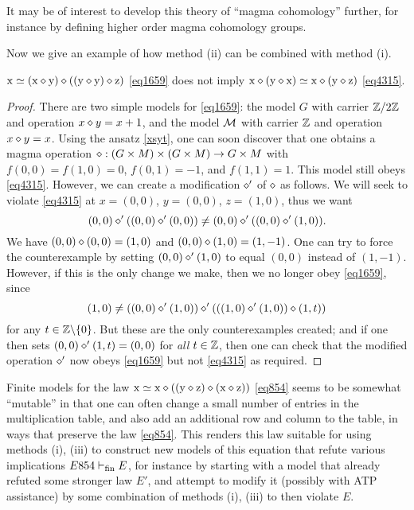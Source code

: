 It may be of interest to develop this theory of ``magma cohomology'' further, for instance by defining higher order magma cohomology groups.

Now we give an example of how method (ii) can be combined with method (i).

\begin{proposition}\label{1659-4315} $\mathrm{x} \simeq (\mathrm{x} \diamond \mathrm{y}) \diamond ((\mathrm{y} \diamond \mathrm{y}) \diamond \mathrm{z})$ \eqref{eq1659} does not imply $\mathrm{x} \diamond (\mathrm{y} \diamond \mathrm{x}) \simeq \mathrm{x} \diamond (\mathrm{y} \diamond \mathrm{z})$ \eqref{eq4315}.
\end{proposition}

\begin{proof}  There are two simple models for \eqref{eq1659}: the model $G$ with carrier $\mathbb{Z}/2\mathbb{Z}$ and operation $x \diamond y = x+1$, and the model ${\mathcal{M}}$ with carrier $\mathbb{Z}$ and operation $x \diamond y = x$.  Using the ansatz \eqref{xsyt}, one can soon discover that one obtains a magma operation $\diamond: (G \times M) \times (G \times M) \to G \times M$ with $f(0,0)=f(1,0)=0$, $f(0,1)=-1$, and $f(1,1)=1$.  This model still obeys \eqref{eq4315}. However, we can create a modification $\diamond'$ of $\diamond$ as follows.  We will seek to violate \eqref{eq4315} at $x = (0,0)$, $y = (0,0)$, $z = (1,0)$, thus we want
$$ (0,0) \diamond' ((0,0) \diamond' (0,0)) \neq (0,0) \diamond' ((0,0) \diamond' (1,0)).$$
We have $(0,0) \diamond (0,0) = (1,0)$ and $(0,0) \diamond (1,0) = (1,-1)$.  One can try to force the counterexample by setting $(0,0) \diamond' (1,0)$ to equal $(0,0)$ instead of $(1,-1)$. However, if this is the only change we make, then we no longer obey \eqref{eq1659}, since
$$ (1,0) \neq ((0,0) \diamond' (1,0)) \diamond' (((1,0) \diamond' (1,0)) \diamond (1,t))$$
for any $t \in \mathbb{Z} \backslash \{0\}$. But these are the only counterexamples created; and if one then sets $(0,0) \diamond' (1,t) = (0,0)$ for \emph{all} $t \in \mathbb{Z}$, then one can check that the modified operation $\diamond'$ now obeys \eqref{eq1659} but not \eqref{eq4315} as required.
\end{proof}

Finite models for the law $\mathrm{x} \simeq \mathrm{x} \diamond ((\mathrm{y} \diamond \mathrm{z}) \diamond (\mathrm{x} \diamond \mathrm{z}))$ \eqref{eq854} seems to be somewhat ``mutable'' in that one can often change a small number of entries in the multiplication table, and also add an additional row and column to the table, in ways that preserve the law \eqref{eq854}.  This renders this law suitable for using methods (i), (iii) to construct new models of this equation that refute various implications $E854 \vdash_{\mathrm{fin}} E$, for instance by starting with a model that already refuted some stronger law $E'$, and attempt to modify it (possibly with ATP assistance) by some combination of methods (i), (iii) to then violate $E$. 

